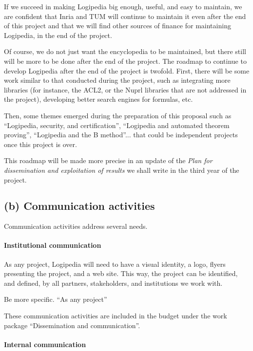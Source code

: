 If we succeed in making Logipedia big enough, useful, and easy to
maintain, we are confident that Inria and TUM will continue to
maintain it even after the end of this project and that we will find
other sources of finance for maintaining Logipedia, in the end of the
project.

Of course, we do not just want the encyclopedia to be maintained, but
there still will be more to be done after the end of the project. The
roadmap to continue to develop Logipedia after the end of the project
is twofold. First, there will be some work similar to that conducted
during the project, such as integrating more libraries (for instance,
the ACL2, or the Nuprl libraries that are not addressed in the
project), developing better search engines for formulas, etc.

Then, some themes emerged during the preparation of this proposal such
as ``Logipedia, security, and certification'', ``Logipedia and
automated theorem proving'', ``Logipedia and the B method''... that
could be independent projects once this project is over.

This roadmap will be made more precise in an update of 
the {\em Plan for dissemination and exploitation of results} 
we shall write in the third year of the project.

\subsection*{(b) Communication activities}

Communication activities address several needs.

\paragraph*{Institutional communication}

As any project, Logipedia will need to have a visual identity, a logo,
flyers presenting the project, and a web site.
This way, the project can be identified, and defined, by all partners,
stakeholders, and institutions we work with.

{\color{red} Be more specific. ``As any project''}

These communication activities are included in the budget under the
work package ``Dissemination and communication''.

\paragraph*{Internal communication}

